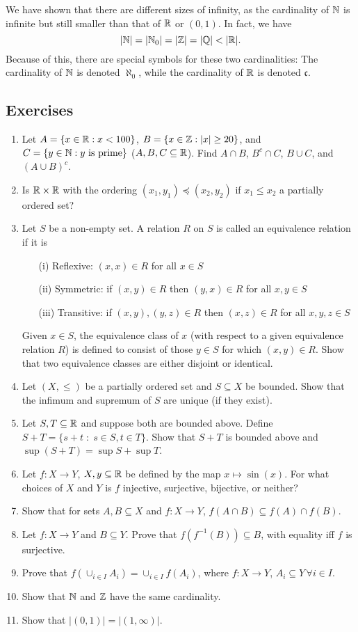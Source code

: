 \documentclass{article}
\begin{document}
We have shown that there are different sizes of infinity, as the cardinality of ${\mathbb{N}}$ is infinite but still smaller than that of ${\mathbb{R}}$ or $(0,1)$. In fact, we have
$$ |{\mathbb{N}}| = |{\mathbb{N}}_0| = |{\mathbb{Z}}| = |{\mathbb{Q}}| < | {\mathbb{R}}|.$$
Because of this, there are special symbols for these two cardinalities: The cardinality of ${\mathbb{N}}$ is denoted $\aleph_0$, while the cardinality of ${\mathbb{R}}$ is denoted $\mathfrak{c}$. 
\subsection{Exercises}
\begin{enumerate}
	\item Let $A = \{x\in {\mathbb{R}} : x <100\}$, $B = \{x\in {\mathbb{Z}} : |x| \geq 20\}$, and $C = \{y \in {\mathbb{N}} : y \text{ is prime}\}$ ($A,B,C \subseteq {\mathbb{R}}$). Find $A \cap B$, $B^c \cap C$, $B \cup C$, and $(A \cup B )^c$.
    \item Is ${\mathbb{R}} \times {\mathbb{R}}$ with the ordering $(x_1,y_1) \preceq (x_2,y_2)$ if $x_1 \leq x_2$ a partially ordered set? 
     \item \cite[Exercise 1.3.1]{tastetopology} Let $S$ be a non-empty set. A relation $R$ on $S$ is called an equivalence relation if it is
    \begin{enumerate}
        \item[(i)] Reflexive: $(x,x) \in R$ for all $x \in S$
        \item[(ii)] Symmetric: if $(x,y) \in R$  then $(y,x) \in R$ for all $x,y \in S$
        \item[(iii)] Transitive: if $(x,y), (y,z) \in R$ then $(x,z) \in R$ for all $x,y,z \in S$
    \end{enumerate}
Given $x \in S$, the equivalence class of $x$ (with respect to a given equivalence relation $R$) is defined to consist of those $y \in S$ for which $(x,y) \in R$. Show that two equivalence classes are either disjoint or identical.
    \item Let $(X, \leq)$ be a partially ordered set and $S\subseteq X$ be bounded. Show that the infimum and supremum of $S$ are unique (if they exist).
    \item Let $S,T \subseteq {\mathbb{R}}$ and suppose both are bounded above. Define $S+T = \{s + t \; \colon \; s\in S,t\in T\}$. Show that $S+T$ is bounded above and $\sup(S+T) = \sup S + \sup T$. 
    \item Let $f: X \to Y$, $X, y \subseteq {\mathbb{R}}$ be defined by the map $x \mapsto \sin(x)$. For what choices of $X$ and $Y$ is $f$ injective, surjective, bijective, or neither?
    \item Show that for sets $A,B \subseteq X$ and $f: X \to Y$, $f(A \cap B) \subseteq f(A) \cap f(B)$.
    \item Let $f: X \to Y$ and $B \subseteq Y$. Prove that $f(f^{-1}(B)) \subseteq B$, with equality iff $f$ is surjective.
    \item Prove that $f(\cup_{i \in I}A_i) = \cup_{i \in I}f(A_i)$, where $f:X \to Y$, $A_i \subseteq Y \, \forall i \in I$.
    \item Show that ${\mathbb{N}}$ and ${\mathbb{Z}}$ have the same cardinality.
    \item Show that $|(0,1)| =|(1,\infty)|$.
\end{enumerate}
\end{document}

